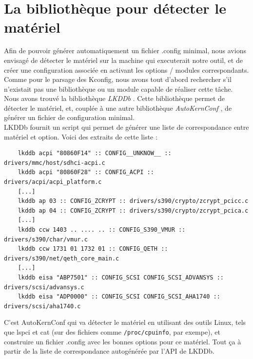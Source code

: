 \documentclass[17pts]{report}
\begin{document}
        \section{La bibliothèque pour détecter le matériel}
    \label{sec:La bibliothèque pour détecter le matériel}

    Afin de pouvoir générer automatiquement un fichier
    .config minimal, nous avions envisagé de détecter le matériel sur la
    machine qui executerait notre outil, et de créer une configuration associée
    en activant les options / modules correspondants. Comme pour le parsage des
    Kconfig, nous avons tout d'abord rechercher s'il n'existait pas une
    bibliothèque ou un module capable de réaliser cette tâche. Nous avons
    trouvé la bibliothèque \textit{LKDDb} \cite{Existant:lib:lkddb}. Cette
    bibliothèque permet de détecter le matériel, et, couplée à une autre
    bibliothèque \textit{AutoKernConf} \cite{Existant:lib:autoKernConf}, de
    générer un fichier de configuration minimal. \\

    LKDDb fournit un script qui permet de générer une liste de correspondance
    entre matériel et option. Voici des extraits de cette liste : \\

    \begin{verbatim}
    lkddb acpi "80860F14" :: CONFIG__UNKNOW__ :: drivers/mmc/host/sdhci-acpi.c
    lkddb acpi "80860F28" :: CONFIG_ACPI :: drivers/acpi/acpi_platform.c
    [...]
    lkddb ap 03 :: CONFIG_ZCRYPT :: drivers/s390/crypto/zcrypt_pcicc.c
    lkddb ap 04 :: CONFIG_ZCRYPT :: drivers/s390/crypto/zcrypt_pcica.c
    [...]
    lkddb ccw 1403 .. .... .. :: CONFIG_S390_VMUR :: drivers/s390/char/vmur.c
    lkddb ccw 1731 01 1732 01 :: CONFIG_QETH :: drivers/s390/net/qeth_core_main.c
    [...]
    lkddb eisa "ABP7501" :: CONFIG_SCSI CONFIG_SCSI_ADVANSYS :: drivers/scsi/advansys.c
    lkddb eisa "ADP0000" :: CONFIG_SCSI CONFIG_SCSI_AHA1740 :: drivers/scsi/aha1740.c
    \end{verbatim}

    C'est AutoKernConf qui va détecter le matériel en utilisant des outils
    Linux, tels que lspci et cat (sur des fichiers comme \verb|/proc/cpuinfo|,
    par exempe), et construire un fichier .config avec les bonnes options pour
    ce matériel. Tout ça à partir de la liste de correspondance autogénérée par
    l'API de LKDDb. \\
\end{document}
